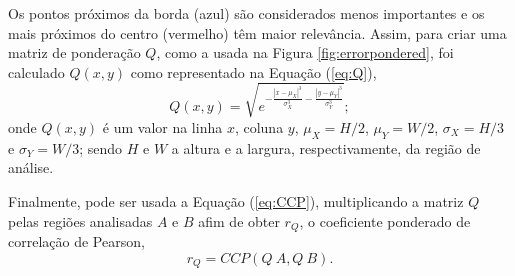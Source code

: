 Os pontos próximos da borda (azul) são considerados menos importantes e os mais próximos do centro 
 (vermelho) têm maior relevância.
Assim, para criar uma matriz de ponderação $Q$, como a usada na Figura \ref{fig:errorpondered},
foi calculado $Q(x,y)$ como representado na Equação (\ref{eq:Q}),
\begin{equation}\label{eq:Q}
 Q(x,y) = \sqrt{e^{ -\frac{|x-\mu_X|^3}{\sigma_X^3}-\frac{|y-\mu_Y|^3}{\sigma_Y^3}  }};
\end{equation}
onde $Q(x,y)$ é um valor na linha $x$, coluna $y$,
$\mu_X=H/2$, $\mu_Y=W/2$, $\sigma_X=H/3$ e $\sigma_Y=W/3$; sendo $H$ e $W$
a altura e a largura, respectivamente, da região de análise.

Finalmente, pode ser usada a Equação (\ref{eq:CCP}), multiplicando a matriz $Q$ pelas 
regiões analisadas $A$ e $B$ afim de obter $r_Q$, o coeficiente ponderado de correlação de Pearson,
\begin{equation}\label{eq:rw}
 r_Q = CCP(Q~A, Q~B).
\end{equation}
